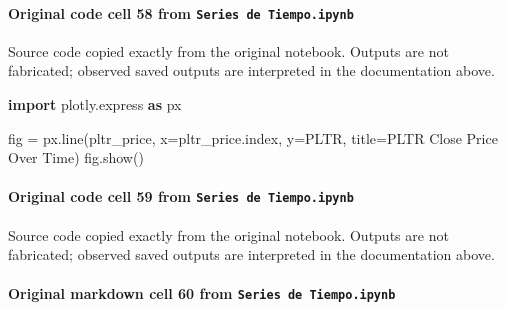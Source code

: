 \documentclass[
  11pt,
]{article}
\newenvironment{Shaded}{}{}
\newcommand{\ImportTok}[1]{\textcolor[rgb]{0.00,0.50,0.00}{\textbf{#1}}}
\newcommand{\NormalTok}[1]{#1}
\newcommand{\OperatorTok}[1]{\textcolor[rgb]{0.40,0.40,0.40}{#1}}
\newcommand{\StringTok}[1]{\textcolor[rgb]{0.25,0.44,0.63}{#1}}
\begin{document}
\paragraph{\texorpdfstring{Original code cell 58 from \texttt{Series\ de\ Tiempo.ipynb}}{Original code cell 58 from Series de Tiempo.ipynb}}\label{original-code-cell-58-from-series-de-tiempoipynb}

Source code copied exactly from the original notebook. Outputs are not fabricated; observed saved outputs are interpreted in the documentation above.

\begin{Shaded}
\begin{Highlighting}[]
\ImportTok{import}\NormalTok{ plotly.express }\ImportTok{as}\NormalTok{ px}

\NormalTok{fig }\OperatorTok{=}\NormalTok{ px.line(pltr\_price, x}\OperatorTok{=}\NormalTok{pltr\_price.index, y}\OperatorTok{=}\StringTok{\textquotesingle{}PLTR\textquotesingle{}}\NormalTok{, title}\OperatorTok{=}\StringTok{\textquotesingle{}PLTR Close Price Over Time\textquotesingle{}}\NormalTok{)}
\NormalTok{fig.show()}
\end{Highlighting}
\end{Shaded}

\paragraph{\texorpdfstring{Original code cell 59 from \texttt{Series\ de\ Tiempo.ipynb}}{Original code cell 59 from Series de Tiempo.ipynb}}\label{original-code-cell-59-from-series-de-tiempoipynb}

Source code copied exactly from the original notebook. Outputs are not fabricated; observed saved outputs are interpreted in the documentation above.

\begin{Shaded}
\begin{Highlighting}[]

\end{Highlighting}
\end{Shaded}

\paragraph{\texorpdfstring{Original markdown cell 60 from \texttt{Series\ de\ Tiempo.ipynb}}{Original markdown cell 60 from Series de Tiempo.ipynb}}\label{original-markdown-cell-60-from-series-de-tiempoipynb}
\end{document}
